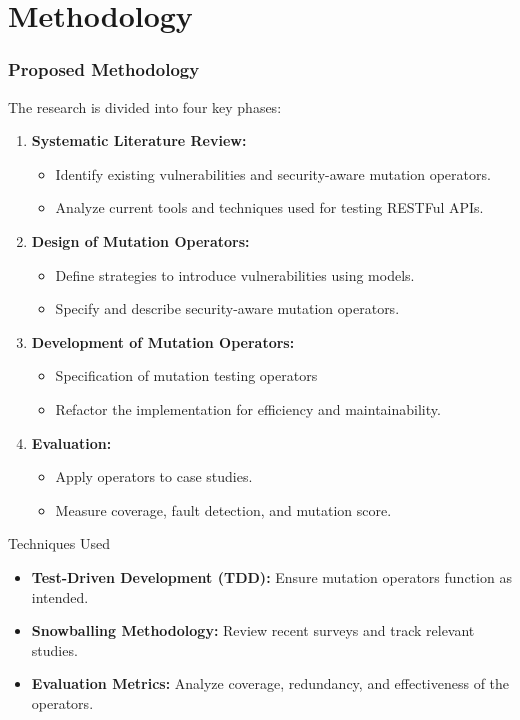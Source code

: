 \documentclass[12pt]{beamer}
\theoremstyle{remark}
\theoremstyle{definition}
\begin{document}
\section{Methodology}
\begin{frame}[allowframebreaks]
\frametitle{Proposed Methodology}
The research is divided into four key phases:
\begin{enumerate}
    \item \textbf{Systematic Literature Review:} 
    \begin{itemize}
        \item Identify existing vulnerabilities and security-aware mutation operators.
        \item Analyze current tools and techniques used for testing RESTFul APIs.
    \end{itemize}
    \item \textbf{Design of Mutation Operators:} 
    \begin{itemize}
        \item Define strategies to introduce vulnerabilities using models.
        \item Specify and describe security-aware mutation operators.
    \end{itemize}
    \item \textbf{Development of Mutation Operators:} 
    \begin{itemize}
        \item Specification of mutation testing operators
        \item Refactor the implementation for efficiency and maintainability.
    \end{itemize}
    \item \textbf{Evaluation:} 
    \begin{itemize}
        \item Apply operators to case studies.
        \item Measure coverage, fault detection, and mutation score.
    \end{itemize}
\end{enumerate}

\begin{block}{Techniques Used}
\begin{itemize}
    \item \textbf{Test-Driven Development (TDD):} Ensure mutation operators function as intended.
    \item \textbf{Snowballing Methodology:} Review recent surveys and track relevant studies.
    \item \textbf{Evaluation Metrics:} Analyze coverage, redundancy, and effectiveness of the operators.
\end{itemize}
\end{block}


\end{frame}
\end{document}
